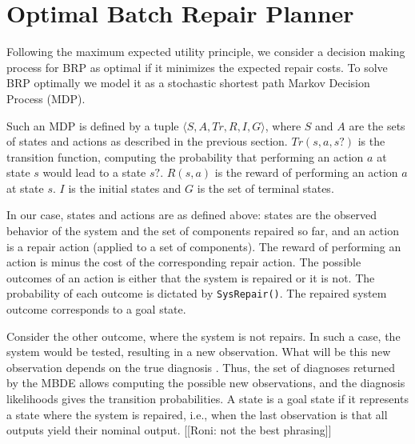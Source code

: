 \section{Optimal Batch Repair Planner}
Following the maximum expected utility principle, we consider a decision making process for BRP as optimal if it minimizes the expected repair costs. To solve BRP optimally we model it as a stochastic shortest path Markov Decision Process (MDP). 

Such an MDP is defined by a tuple $\langle S,A,Tr,R,I,G \rangle$, where $S$ and $A$ are the sets of states and actions as described in the previous section. $Tr(s,a,s?)$ is the transition function, computing the probability that performing an action $a$ at state $s$ would lead to a state $s?$. $R(s,a)$ is the reward of performing an action $a$ at state $s$. $I$ is the initial states and $G$ is the set of terminal states.

In our case, states and actions are as defined above: states are the observed behavior of the system and the set of components repaired so far, and an action is a repair action (applied to a set of components). The reward of performing an action is minus the cost of the corresponding repair action. The possible outcomes of an action is either that the system is repaired or it is not. The probability of each outcome is dictated by {\tt SysRepair()}. The repaired system outcome corresponds to a goal state.

Consider the other outcome, where the system is not repairs. In such a case, the system would be tested, resulting in a new observation. What will be this new observation depends on the true diagnosis . Thus, the set of diagnoses returned by the MBDE allows computing the possible new observations, and the diagnosis likelihoods gives the transition probabilities. A state is a goal state if it represents a state where the system is repaired, i.e., when the last observation is that all outputs yield their nominal output. [[Roni: not the best phrasing]]

